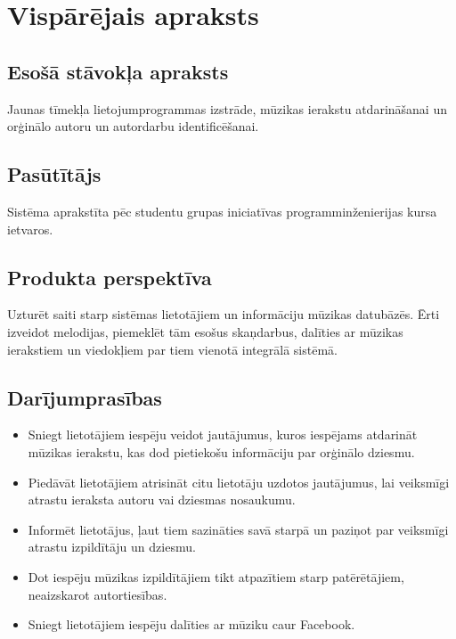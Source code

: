\documentclass[12pt]{article}
\begin{document}
\pagebreak

\section{Vispārējais apraksts}

\subsection{Esošā stāvokļa apraksts}

Jaunas tīmekļa lietojumprogrammas izstrāde, mūzikas ierakstu atdarināšanai un orģinālo autoru un autordarbu identificēšanai.

\subsection{Pasūtītājs}

Sistēma aprakstīta pēc studentu grupas iniciatīvas programminženierijas kursa ietvaros.

\subsection{Produkta perspektīva}

Uzturēt saiti starp sistēmas lietotājiem un informāciju mūzikas datubāzēs. Ērti izveidot melodijas, piemeklēt tām esošus skaņdarbus, dalīties ar mūzikas ierakstiem un viedokļiem par tiem vienotā integrālā sistēmā.

\subsection{Darījumprasības}
\begin{itemize}
\item Sniegt lietotājiem iespēju veidot jautājumus, kuros iespējams atdarināt mūzikas ierakstu, kas dod pietiekošu informāciju par orģinālo dziesmu.
\item Piedāvāt lietotājiem atrisināt citu lietotāju uzdotos jautājumus, lai veiksmīgi atrastu ieraksta autoru vai dziesmas nosaukumu.
\item Informēt lietotājus, ļaut tiem sazināties savā starpā un paziņot par veiksmīgi atrastu izpildītāju un dziesmu.
\item Dot iespēju mūzikas izpildītājiem tikt atpazītiem starp patērētājiem, neaizskarot autortiesības.
\item Sniegt lietotājiem iespēju dalīties ar mūziku caur Facebook.
\end{itemize}
\end{document}
